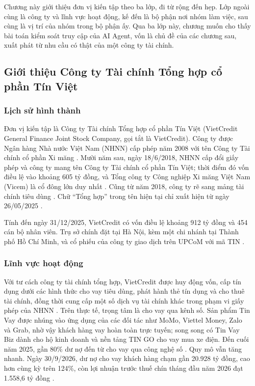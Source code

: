 
Chương này giới thiệu đơn vị kiến tập theo ba lớp, đi từ rộng đến hẹp. Lớp ngoài cùng là công ty và lĩnh vực hoạt động, kế đến là bộ phận nơi nhóm làm việc, sau cùng là vị trí của nhóm trong bộ phận ấy. Qua ba lớp này, chương muốn cho thấy bài toán kiểm soát truy cập của AI Agent, vốn là chủ đề của các chương sau, xuất phát từ nhu cầu có thật của một công ty tài chính.

\subsection{Giới thiệu Công ty Tài chính Tổng hợp cổ phần Tín Việt}

\subsubsection{Lịch sử hình thành}

Đơn vị kiến tập là Công ty Tài chính Tổng hợp cổ phần Tín Việt (VietCredit General Finance Joint Stock Company, gọi tắt là VietCredit). Công ty được Ngân hàng Nhà nước Việt Nam (NHNN) cấp phép năm 2008 với tên Công ty Tài chính cổ phần Xi măng \parencite{vietcredit_bctn2025}. Mười năm sau, ngày 18/6/2018, NHNN cấp đổi giấy phép và công ty mang tên Công ty Tài chính cổ phần Tín Việt; thời điểm đó vốn điều lệ vào khoảng 605 tỷ đồng, và Tổng công ty Công nghiệp Xi măng Việt Nam (Vicem) là cổ đông lớn duy nhất \parencite{nhadautu_doiten2018}. Cũng từ năm 2018, công ty rẽ sang mảng tài chính tiêu dùng \parencite{vietcredit_bctn2025}. Chữ ``Tổng hợp'' trong tên hiện tại chỉ xuất hiện từ ngày 26/05/2025 \parencite{baodautu_doiten2025}.

Tính đến ngày 31/12/2025, VietCredit có vốn điều lệ khoảng 912 tỷ đồng và 454 cán bộ nhân viên. Trụ sở chính đặt tại Hà Nội, kèm một chi nhánh tại Thành phố Hồ Chí Minh, và cổ phiếu của công ty giao dịch trên UPCoM với mã TIN \parencite{vietcredit_bctn2025}.

\subsubsection{Lĩnh vực hoạt động}

Với tư cách công ty tài chính tổng hợp, VietCredit được huy động vốn, cấp tín dụng dưới các hình thức cho vay tiêu dùng, phát hành thẻ tín dụng và cho thuê tài chính, đồng thời cung cấp một số dịch vụ tài chính khác trong phạm vi giấy phép của NHNN \parencite{vietcredit_bctn2025}. Trên thực tế, trọng tâm là cho vay qua kênh số. Sản phẩm Tin Vay được nhúng vào ứng dụng của các đối tác như MoMo, Viettel Money, Zalo và Grab, nhờ vậy khách hàng vay hoàn toàn trực tuyến; song song có Tin Vay Biz dành cho hộ kinh doanh và nền tảng TIN GO cho vay mua xe điện. Đến cuối năm 2025, gần 80\% dư nợ đến từ cho vay qua công nghệ số \parencite{vietcredit_kqkd2025}. Quy mô vẫn tăng nhanh. Ngày 30/9/2026, dư nợ cho vay khách hàng chạm gần 20.928 tỷ đồng, cao hơn cùng kỳ trên 124\%, còn lợi nhuận trước thuế chín tháng đầu năm 2026 đạt 1.558,6 tỷ đồng \parencite{vnba_9t2026}.

